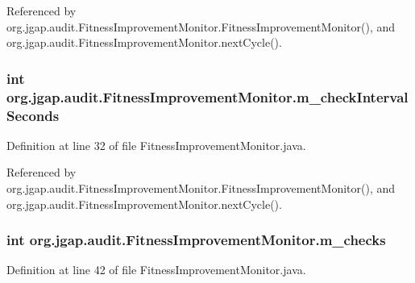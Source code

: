 Referenced by org.\-jgap.\-audit.\-Fitness\-Improvement\-Monitor.\-Fitness\-Improvement\-Monitor(), and org.\-jgap.\-audit.\-Fitness\-Improvement\-Monitor.\-next\-Cycle().

\hypertarget{classorg_1_1jgap_1_1audit_1_1_fitness_improvement_monitor_a65daf141a1c712887451c66c1458d7b3}{
\subsubsection[{m\-\_\-check\-Interval\-Seconds}]{\setlength{\rightskip}{0pt plus 5cm}int org.\-jgap.\-audit.\-Fitness\-Improvement\-Monitor.\-m\-\_\-check\-Interval\-Seconds\hspace{0.3cm}{\ttfamily [private]}}}\label{classorg_1_1jgap_1_1audit_1_1_fitness_improvement_monitor_a65daf141a1c712887451c66c1458d7b3}


Definition at line 32 of file Fitness\-Improvement\-Monitor.\-java.



Referenced by org.\-jgap.\-audit.\-Fitness\-Improvement\-Monitor.\-Fitness\-Improvement\-Monitor(), and org.\-jgap.\-audit.\-Fitness\-Improvement\-Monitor.\-next\-Cycle().

\hypertarget{classorg_1_1jgap_1_1audit_1_1_fitness_improvement_monitor_a84a7f22d4233579be20a91192a4d0338}{
\subsubsection[{m\-\_\-checks}]{\setlength{\rightskip}{0pt plus 5cm}int org.\-jgap.\-audit.\-Fitness\-Improvement\-Monitor.\-m\-\_\-checks\hspace{0.3cm}{\ttfamily [private]}}}\label{classorg_1_1jgap_1_1audit_1_1_fitness_improvement_monitor_a84a7f22d4233579be20a91192a4d0338}


Definition at line 42 of file Fitness\-Improvement\-Monitor.\-java.




